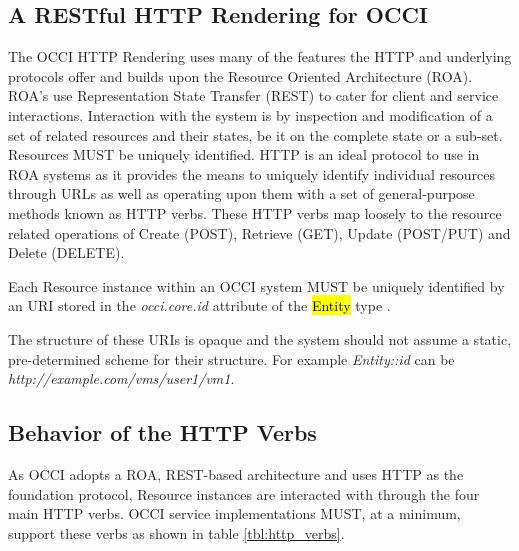 \documentclass[10pt,a4paper]{article}
\begin{document}
\subsection{A RESTful HTTP Rendering for OCCI}
The OCCI HTTP Rendering uses many of the features the HTTP and underlying
protocols offer and builds upon the Resource Oriented
Architecture (ROA). ROA's use Representation State Transfer (REST)
\cite{REST_Fielding} to cater for client and service
interactions. Interaction with the system is by inspection and
modification of a set of related resources and their states, be it on
the complete state or a sub-set. Resources MUST be uniquely
identified. HTTP is an ideal protocol to use in ROA systems as it
provides the means to uniquely identify individual resources through
URLs as well as operating upon them with a set of general-purpose
methods known as HTTP verbs. These HTTP verbs map loosely to the
resource related operations of Create (POST), Retrieve (GET), Update
(POST/PUT) and Delete (DELETE).

Each Resource instance within an OCCI system MUST be uniquely
identified by an URI stored in the \emph{occi.core.id} attribute of the
\hl{Entity} type \cite{occi:core}.

The structure of these URIs is opaque and the system should not assume
a static, pre-determined scheme for their structure. For example
\emph{Entity::id} can be \emph{http://example.com/vms/user1/vm1}.

\subsection{Behavior of the HTTP Verbs}
As OCCI adopts a ROA, REST-based architecture and uses HTTP as the
foundation protocol,  Resource instances are interacted with 
through the four main HTTP verbs. OCCI service
implementations MUST, at a minimum, support these verbs as shown in
table \ref{tbl:http_verbs}.
\end{document}
